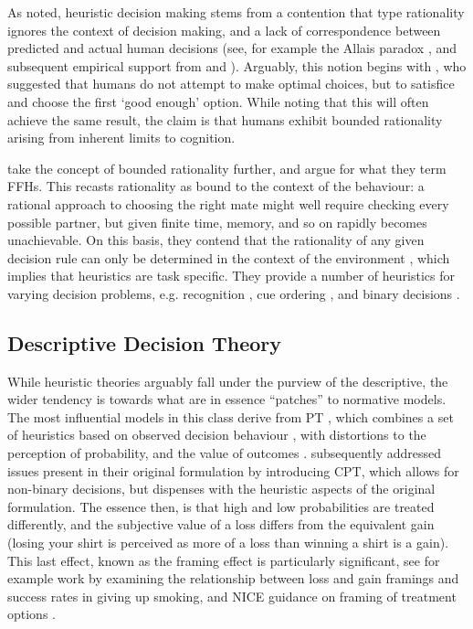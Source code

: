As noted, heuristic decision making stems from a contention that \citeauthor{Neumann1953} type rationality ignores the context of decision making, and a lack of correspondence between predicted and actual human decisions (see, for example the Allais paradox \citep{Society2013}, and subsequent empirical support from \citet{Burke1996} and \citet{Oliver2003}). Arguably, this notion begins with \citet{Simon1956}, who suggested that humans do not attempt to make optimal choices, but to satisfice and choose the first `good enough' option. While noting that this will often achieve the same result, the claim is that humans exhibit bounded rationality \citep{Simon2000} arising from inherent limits to cognition.

\citet{Gigerenzer1996} take the concept of bounded rationality further, and argue for what they term \acp{FFH}. This recasts rationality as bound to the context of the behaviour: a rational approach to choosing the right mate might well require checking every possible partner, but given finite time, memory, and so on rapidly becomes unachievable. On this basis, they contend that the rationality of any given decision rule can only be determined in the context of the environment \citep{Todd2003}, which implies that heuristics are task specific. They provide a number of heuristics for varying decision problems, e.g. recognition \citep{Goldstein2002}, cue ordering \citep{Gigerenzer1999,Todd2004}, and binary decisions \citep{Brandstatter2006}.

\subsection{Descriptive Decision Theory}\label{sub:descriptive_theories}

While heuristic theories arguably fall under the purview of the descriptive, the wider tendency is towards what are in essence \enquote{patches} to normative models. The most influential models in this class derive from \ac{PT} \citep{Kahneman1979}, which combines a set of heuristics based on observed decision behaviour \citep{Tversky1974}, with distortions to the perception of probability, and the value of outcomes \citep{Kahneman1984,Tversky1986}. \citet{Tversky1992} subsequently addressed issues present in their original formulation by introducing \ac{CPT}, which allows for non-binary decisions, but dispenses with the heuristic aspects of the original formulation. The essence then, is that high and low probabilities are treated differently, and the subjective value of a loss differs from the equivalent gain (losing your shirt is perceived as more of a loss than winning a shirt is a gain).
This last effect, known as the framing effect is particularly significant, see for example work by \citet{Toll2007} examining the relationship between loss and gain framings and success rates in giving up smoking, and \ac{NICE} guidance on framing of treatment options \citep{NICE2007}.


